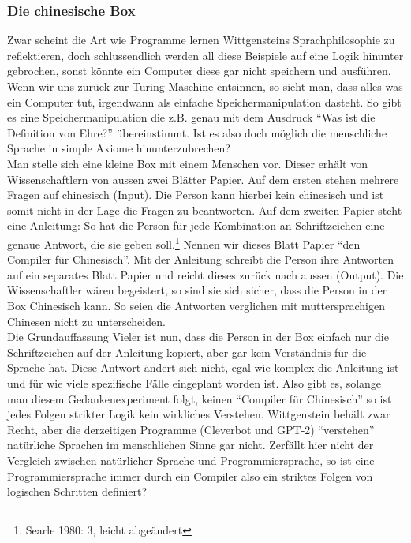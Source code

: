 \documentclass[10pt,a4paper]{article}
\begin{document}
\subsubsection{Die chinesische Box}
Zwar scheint die Art wie Programme lernen Wittgensteins Sprachphilosophie zu reflektieren, doch schlussendlich werden all diese Beispiele auf eine Logik hinunter gebrochen, sonst könnte ein Computer diese gar nicht speichern und ausführen. Wenn wir uns zurück zur Turing-Maschine entsinnen, so sieht man, dass alles was ein Computer tut, irgendwann als einfache Speichermanipulation dasteht. So gibt es eine Speichermanipulation die z.B. genau mit dem Ausdruck \enquote{Was ist die Definition von Ehre?} übereinstimmt. Ist es also doch möglich die menschliche Sprache in simple Axiome hinunterzubrechen? \\
Man stelle sich eine kleine Box mit einem Menschen vor. Dieser erhält von Wissenschaftlern von aussen zwei Blätter Papier. Auf dem ersten stehen mehrere Fragen auf chinesisch (Input). Die Person kann hierbei kein chinesisch und ist somit nicht in der Lage die Fragen zu beantworten. Auf dem zweiten Papier steht eine Anleitung: So hat die Person für jede Kombination an Schriftzeichen eine genaue Antwort, die sie geben soll.\footnote{Searle 1980: 3, leicht abgeändert} Nennen wir dieses Blatt Papier \enquote{den Compiler für Chinesisch}. Mit der Anleitung schreibt die Person ihre Antworten auf ein separates Blatt Papier und reicht dieses zurück nach aussen (Output). Die Wissenschaftler wären begeistert, so sind sie sich sicher, dass die Person in der Box Chinesisch kann. So seien die Antworten verglichen mit muttersprachigen Chinesen nicht zu unterscheiden. \\
Die Grundauffassung Vieler ist nun, dass die Person in der Box einfach nur die Schriftzeichen auf der Anleitung kopiert, aber gar kein Verständnis für die Sprache hat. Diese Antwort ändert sich nicht, egal wie komplex die Anleitung ist und für wie viele spezifische Fälle eingeplant worden ist. Also gibt es, solange man diesem Gedankenexperiment folgt, keinen \enquote{Compiler für Chinesisch} so ist jedes Folgen strikter Logik kein wirkliches Verstehen. Wittgenstein behält zwar Recht, aber die derzeitigen Programme (Cleverbot und GPT-2) \enquote{verstehen} natürliche Sprachen im menschlichen Sinne gar nicht. Zerfällt hier nicht der Vergleich zwischen natürlicher Sprache und Programmiersprache, so ist eine Programmiersprache immer durch ein Compiler also ein striktes Folgen von logischen Schritten definiert?
\end{document}
